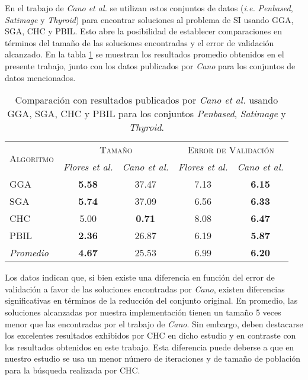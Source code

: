 En el trabajo de \emph{Cano et al.} \cite{cano2003using} se utilizan estos conjuntos de datos (\emph{i.e.} \emph{Penbased}, \emph{Satimage} y \emph{Thyroid}) para encontrar soluciones al problema de SI usando GGA, SGA, CHC y PBIL. Esto abre la posibilidad de establecer comparaciones en términos del tamaño de las soluciones encontradas y el error de validación alcanzado. En la tabla \ref{res-big-cano} se muestran los resultados promedio obtenidos en el presente trabajo, junto con los datos publicados por \emph{Cano} para los conjuntos de datos mencionados.

\begin{table}[h!]
\centering
\begin{tabular}{l c c c c}
\hline
\multirow{2}{*}{\textsc{Algoritmo}}
	& \multicolumn{2}{c}{\textsc{\hspace*{30pt}Tamaño\hspace*{30pt}}}
	& \multicolumn{2}{c}{\textsc{Error de Validación}} \\\cline{2-5}
 & \scriptsize{\emph{Flores et al.}} & \scriptsize{\emph{Cano et al.}}
 	& \scriptsize{\emph{Flores et al.}} & \scriptsize{\emph{Cano et al.}} \\
\hline
\hline
GGA  & \textbf{5.58} & 37.47 & 7.13 & \textbf{6.15} \\
SGA  & \textbf{5.74} & 37.09 & 6.56 & \textbf{6.33} \\
CHC  & 5.00 &  \textbf{0.71} & 8.08 & \textbf{6.47} \\
PBIL & \textbf{2.36} & 26.87 & 6.19 & \textbf{5.87} \\
\hline
\emph{Promedio} & \textbf{4.67} & 25.53 & 6.99 & \textbf{6.20} \\
\hline
\end{tabular}
\caption[Comparación con los resultados publicados por \emph{Cano et al.}]{Comparación con resultados publicados por \emph{Cano et al.} usando GGA, SGA, CHC y PBIL para los conjuntos \emph{Penbased}, \emph{Satimage} y \emph{Thyroid}.}
\label{res-big-cano}
\end{table}

Los datos indican que, si bien existe una diferencia en función del error de validación  a favor de las soluciones encontradas por \emph{Cano}, existen diferencias significativas en términos de la reducción del conjunto original. En promedio, las soluciones alcanzadas por nuestra implementación tienen un tamaño 5 veces menor que las encontradas por el trabajo de \emph{Cano}. Sin embargo, deben destacarse los excelentes resultados exhibidos por CHC en dicho estudio y en contraste con los resultados obtenidos en este trabajo. Esta diferencia puede deberse a que en nuestro estudio se usa un menor número de iteraciones y de tamaño de población para la búsqueda realizada por CHC.

